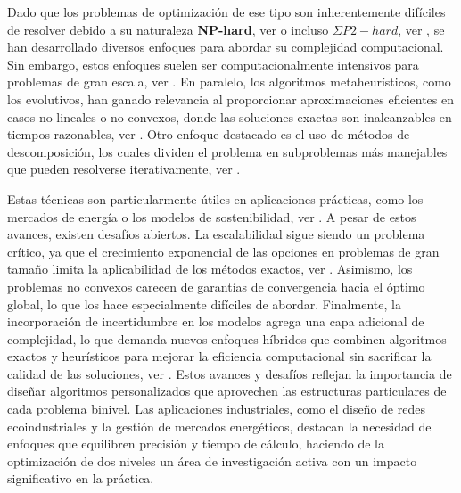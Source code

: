 Dado que los problemas de optimización de ese tipo son inherentemente difíciles de resolver debido a su naturaleza \textbf{NP-hard}, ver \cite{Jeroslow1985ThePHNP,jonathan_f__bard_1991NP}
o incluso $\Sigma P2-hard$, ver \cite{phdthesisCerulli, DempeyZemkoho2020},
se han desarrollado diversos enfoques para abordar su complejidad computacional. 
Sin embargo, estos enfoques suelen ser computacionalmente intensivos para problemas de gran escala, ver \cite{phdthesisCerulli}.
En paralelo, los algoritmos metaheurísticos, como los evolutivos, han ganado relevancia al proporcionar aproximaciones eficientes en casos no lineales o no convexos, donde las soluciones exactas son inalcanzables en tiempos razonables, ver \cite{Sinha2017ARO}.
Otro enfoque destacado es el uso de métodos de descomposición, los cuales dividen el problema en subproblemas más manejables que pueden resolverse iterativamente, ver \cite{Floudas1990ACO}.

Estas técnicas son particularmente útiles en aplicaciones prácticas, como los mercados de energía o los modelos de sostenibilidad, ver \cite{SadddiquiNaturalGasSOS1}.
A pesar de estos avances, existen desafíos abiertos. La escalabilidad sigue siendo un problema crítico, ya que el crecimiento exponencial de las opciones en problemas de gran tamaño limita la aplicabilidad de los métodos exactos, ver \cite{DempeyZemkoho2020}. Asimismo, los problemas no convexos carecen de garantías de convergencia hacia el óptimo global, lo que los hace especialmente difíciles de abordar. Finalmente, la incorporación de incertidumbre en los modelos agrega una capa adicional de complejidad, lo que demanda nuevos enfoques híbridos que combinen algoritmos exactos y heurísticos para mejorar la eficiencia computacional sin sacrificar la calidad de las soluciones, ver \cite{phdthesisCerulli,Sinha2017ARO}. Estos avances y desafíos reflejan la importancia de diseñar algoritmos personalizados que aprovechen las estructuras particulares de cada problema binivel. Las aplicaciones industriales, como el diseño de redes ecoindustriales y la gestión de mercados energéticos, destacan la necesidad de enfoques que equilibren precisión y tiempo de cálculo, haciendo de la optimización de dos niveles un área de investigación activa con un impacto significativo en la práctica.



